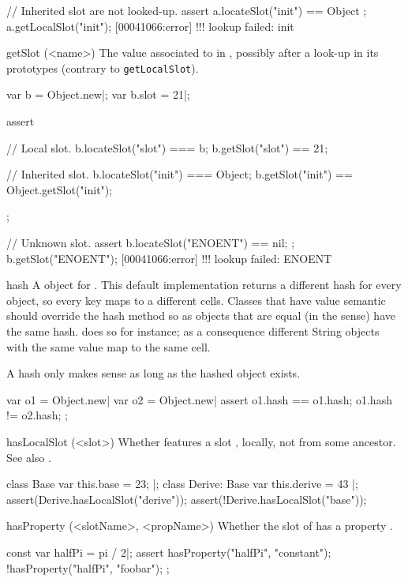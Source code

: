 \begin{urbiscriptapi}
\begin{urbiscript}
// Inherited slot are not looked-up.
assert { a.locateSlot("init") == Object };
a.getLocalSlot("init");
[00041066:error] !!! lookup failed: init
\end{urbiscript}

\item[getSlot](<name>)%
  The value associated to  in \this, possibly
  after a look-up in its prototypes (contrary to
  \lstinline|getLocalSlot|).
\begin{urbiscript}
var b = Object.new|;
var b.slot = 21|;

assert
{
  // Local slot.
  b.locateSlot("slot") === b;
  b.getSlot("slot") == 21;

  // Inherited slot.
  b.locateSlot("init") === Object;
  b.getSlot("init") == Object.getSlot("init");
};

// Unknown slot.
assert { b.locateSlot("ENOENT") == nil; };
b.getSlot("ENOENT");
[00041066:error] !!! lookup failed: ENOENT
\end{urbiscript}

\item[hash]%
  A  object for \this.  This default implementation returns
  a different hash for every object, so every key maps to a different
  cells. Classes that have value semantic should override the hash method so
  as objects that are equal (in the  sense) have the
  same hash.  does so for instance; as a consequence
  different String objects with the same value map to the same cell.

  A hash only makes sense as long as the hashed object exists.

\begin{urbiscript}
var o1 = Object.new|
var o2 = Object.new|
assert
{
  o1.hash == o1.hash;
  o1.hash != o2.hash;
};
\end{urbiscript}

\item[hasLocalSlot](<slot>)%
  Whether \this features a slot , locally, not
  from some ancestor.  See also .
\begin{urbiscript}
class Base         { var this.base = 23; } |;
class Derive: Base { var this.derive = 43 } |;
assert(Derive.hasLocalSlot("derive"));
assert(!Derive.hasLocalSlot("base"));
\end{urbiscript}

\item[hasProperty](<slotName>, <propName>)%
  Whether the slot  of \this has a property
  .
\begin{urbiscript}
const var halfPi = pi / 2|;
assert
{
  hasProperty("halfPi", "constant");
  !hasProperty("halfPi", "foobar");
};
\end{urbiscript}


\end{urbiscriptapi}
